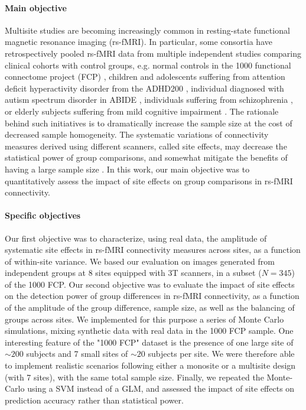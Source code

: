 \documentclass[authoryear]{elsarticle}
\begin{document}
\paragraph{Main objective}
Multisite studies are becoming increasingly common in resting-state functional
magnetic resonance imaging (rs-fMRI). In particular, some consortia have
retrospectively pooled rs-fMRI data from multiple independent studies comparing
clinical cohorts with control groups, e.g. normal controls in the 1000
functional connectome project (FCP) \citep{Biswal2010}, children and adolescents
suffering from attention deficit hyperactivity disorder from the ADHD200
\citep{ADHD200,Fair2012}, individual diagnosed with autism spectrum disorder in
ABIDE \citep{Nielsen2013}, individuals suffering from schizophrenia
\citep{Cheng2015}, or elderly subjects suffering from mild cognitive impairment
\citep{Tam2015}. The rationale behind such initiatives is to dramatically
increase the sample size at the cost of decreased sample homogeneity. The
systematic variations of connectivity measures derived using different scanners,
called site effects, may decrease the statistical power of group comparisons,
and somewhat mitigate the benefits of having a large sample size
\citep{Brown2011,Jovicich2016}. In this work, our main objective was to
quantitatively assess the impact of site effects on group comparisons in rs-fMRI
connectivity.


\paragraph{Specific objectives}
Our first objective was to characterize, using real data, the amplitude of
systematic site effects in rs-fMRI connectivity measures across sites, as a function
of within-site variance. We based our evaluation on images generated from
independent groups at 8 sites equipped with 3T scanners, in a subset
($N=345$) of the 1000 FCP. Our second objective was to evaluate the impact of
site effects on the detection power of group differences in rs-fMRI
connectivity, as a function of the amplitude of the group difference, sample
size, as well as the balancing of groups across sites. We implemented for this
purpose a series of Monte Carlo simulations, mixing synthetic data with real
data in the 1000 FCP sample. One interesting feature of the "1000 FCP" dataset is the presence of one large site of $\sim200$ subjects and 7 small sites of $\sim20$ subjects per site. We were therefore able to implement realistic scenarios following either a monosite or a multisite design (with 7 sites), with the same total sample size. Finally, we repeated the Monte-Carlo using a SVM instead of a GLM, and assessed the impact of site effects on prediction accuracy rather than statistical power.
\end{document}
